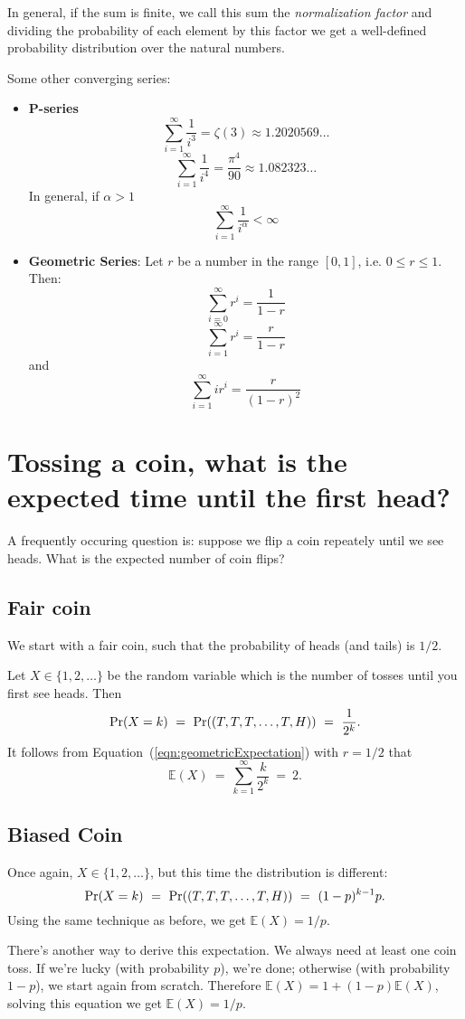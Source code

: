 \documentclass{report}
\theoremstyle{plain}
\theoremstyle{definition}
\newcommand{\E}{\mathbb{E}}
\newcommand{\pr}{\mbox{\rm Pr}}
\begin{document}
In general, if the sum is finite, we call this sum the {\em
  normalization factor} and dividing the probability of each element
by this factor we get a well-defined probability distribution over the
natural numbers.

Some other converging series:
\begin{itemize}
\item {\bf P-series}
\[
\sum_{i=1}^{\infty} \frac{1}{i^3} = \zeta(3) \approx 1.2020569\ldots
\]
\[
\sum_{i=1}^{\infty} \frac{1}{i^4} = \frac{\pi^4}{90} \approx 1.082323\ldots
\]
In general, if $\alpha>1$ 
\[
\sum_{i=1}^{\infty} \frac{1}{i^{\alpha}} < \infty
\]

\item{\bf Geometric Series}:
Let $r$ be a number in the range $[0,1]$, i.e. $0 \leq r \leq 1$. Then:
\[
\sum_{i=0}^\infty r^i = \frac{1}{1-r}
\]
\[
\sum_{i=1}^\infty r^i = \frac{r}{1-r}
\]
and
\begin{equation} \label{eqn:geometricExpectation}
\sum_{i=1}^\infty ir^i = \frac{r}{(1-r)^2}
\end{equation}
\end{itemize}


\section{Tossing a coin, what is the expected time until the first head?}

A frequently occuring question is: suppose we flip a coin repeately
until we see heads. What is the expected number of coin flips?

\subsection{Fair coin}
We start with a fair coin, such that the probability of heads (and
tails) is $1/2$.

Let $X \in \{1,2,\ldots\}$ be the random variable which is the 
number of tosses until you first see heads. Then
$$ \pr(X = k)
\ = \ 
\pr((T,T,T,\ldots,T,H))
\ = \ 
\frac{1}{2^k}.
$$
It follows from Equation~(\ref{eqn:geometricExpectation}) with $r=1/2$ that
$$ \E(X) 
\ = \ 
\sum_{k=1}^\infty \frac{k}{2^k} 
\ = \ 
2.
$$

\subsection{Biased Coin}

Once again, $X \in \{1,2,\ldots\}$, but this time the distribution is different:
$$ \pr(X = k)
\ = \ 
\pr((T,T,T,\ldots,T,H))
\ = \ 
(1-p)^{k-1}p.
$$
Using the same technique as before, we get $\E(X) = 1/p$.

There's another way to derive this expectation. We always need at
least one coin toss.  If we're lucky (with probability $p$), we're
done; otherwise (with probability $1-p$), we start again from
scratch. Therefore $\E(X) = 1 + (1-p) \E(X)$, solving this equation
we get $\E(X) = 1/p$.
\end{document}

